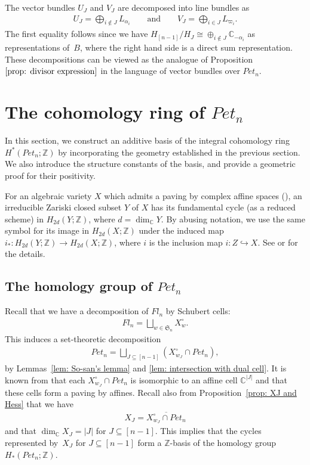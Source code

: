 \begin{rema}\label{rem: decomposition into line bundles}
The vector bundles $U_J$ and $V_J$ are decomposed into line bundles as
\begin{align*}
U_J = \bigoplus_{i\notin J} L_{\alpha_i}
\qquad \text{and}\qquad
V_J = \bigoplus_{i\in J} L_{\varpi_i}.
\end{align*} 
The first equality follows since we have $H_{[n-1]}/H_J\cong \oplus_{i\notin J}{\mathbb C}_{-\alpha_i}$ as representations of~$B$, where the right hand side is a direct sum representation. These decompositions can be viewed as the analogue of Proposition $\ref{prop: divisor expression}$ in the language of vector bundles over $Pet_{n}$.
\end{rema}

\section{The cohomology ring of \texorpdfstring{$Pet_{n}$}{Petn}}\label{sec: cohomology}
In this section, we construct an additive basis of the integral cohomology ring $H^*(Pet_{n};{\mathbb Z})$ by incorporating the geometry established in the previous section.
We also introduce the structure constants of the basis, and provide a geometric proof for their positivity.

For an algebraic variety $X$ which admits a paving by complex affine spaces (\cite[Definition~2.1]{ty}),
an irreducible Zariski closed subset $Y$ of $X$ has its fundamental cycle (as a reduced scheme) in $H_{2d}(Y;{\mathbb Z})$, where $d=\dim_{{\mathbb C}}Y$.
By abusing notation, we use the same symbol for its image in $H_{2d}(X;{\mathbb Z})$ under the induced map $i_*\colon H_{2d}(Y;{\mathbb Z})\rightarrow H_{2d}(X;{\mathbb Z})$, where $i$ is the inclusion map $i\colon Z\hookrightarrow X$. See \cite[Appendix~B]{fult97} or \cite[Chap.~19]{Fulton} for the details.

\subsection{The homology group of \texorpdfstring{$Pet_{n}$}{Petn}}
Recall that we have a decomposition of $Fl_n$ by Schubert cells:
\begin{align*}
  Fl_n = \bigsqcup_{w\in\mathfrak{S}_n} X^{\circ}_{w}.
\end{align*}
This induces a set-theoretic decomposition
\begin{align*}
 Pet_{n} = \bigsqcup_{J\subseteq[n-1]} (X^{\circ}_{w_J}\cap Pet_{n}),
\end{align*}
by Lemmas~\ref{lem: So-san's lemma} and \ref{lem: intersection with dual cell}. It is known from \cite{Peterson,ty} that each $X^{\circ}_{w_J}\cap Pet_{n}$ is isomorphic to an affine cell ${\mathbb C}^{|J|}$ and that these cells form a paving by affines. Recall also from Proposition~\ref{prop: XJ and Hess} that we have
\begin{align*}
 X_J = \overline{X^{\circ}_{w_J}\cap Pet_{n}}
\end{align*}
and that $\dim_{{\mathbb C}}X_J=|J|$ for $J\subseteq[n-1]$. This implies that the cycles represented by~$X_J$ for $J\subseteq[n-1]$ form a ${\mathbb Z}$-basis of the homology group $H_*(Pet_{n};{\mathbb Z})$. 

